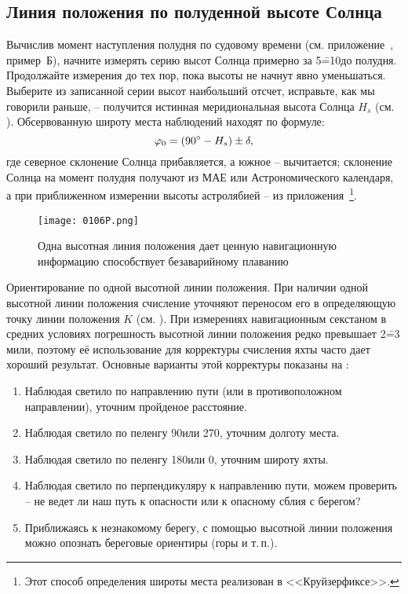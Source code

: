 \subsection{Линия положения по полуденной высоте Солнца}

Вычислив момент наступления полудня по судовому
времени (см. приложение~, пример~Б), начните измерять серию
высот Солнца примерно за 5\==10\tmin до полудня. Продолжайте измерения
до тех пор, пока высоты не начнут явно уменьшаться. Выберите из
записанной серии высот наибольший отсчет, исправьте, как мы говорили
раньше, \--- получится истинная меридиональная высота Солнца
$H_s$ (см. ). Обсервованную широту места наблюдений находят по формуле:
%
\begin{equation}
  \label{eq:75}
  \varphi_0 = (90^\circ - H_s) \pm \delta,
\end{equation}
% 
где северное склонение Солнца прибавляется, а южное \--- вычитается;
склонение Солнца на момент полудня получают из МАЕ или
Астрономического календаря, а при приближенном измерении высоты
астролябией \--- из приложения~\footnote{Этот способ
  определения широты места реализован в <<Круйзерфиксе>>.}.

\begin{figure*}[!htb]
  \centering
  \texttt{[image: 0106P.png]}
  \caption[Одна высотная линия положения]{Одна высотная линия положения дает ценную навигационную информацию способствует безаварийному плаванию}
  \label{fig:106}
\end{figure*}

Ориентирование по одной высотной линии положения. При наличии одной
высотной линии положения счисление уточняют переносом его в
определяющую точку линии положения $K$ (см. ). При измерениях
навигационным секстаном в средних условиях погрешность высотной линии
положения редко превышает 2\==3 мили, поэтому её использование для
корректуры счисления яхты часто дает хороший результат. Основные
варианты этой корректуры показаны на :

\begin{enumerate}
\item Наблюдая светило по направлению пути (или в противоположном
  направлении), уточним пройденое расстояние.
\item Наблюдая светило по пеленгу 90\gr или 270\gr, уточним долготу
  места.
\item Наблюдая светило по пеленгу 180\gr или 0\gr, уточним широту
  яхты.
\item Наблюдая светило по перпендикуляру к направлению пути, можем
  проверить \--- не ведет ли наш путь к опасности или к опасному сблия
  с берегом?
\item Приближаясь к незнакомому берегу, с помощью высотной линии
  положения можно опознать береговые ориентиры (горы и т.\,п.).
\end{enumerate}

